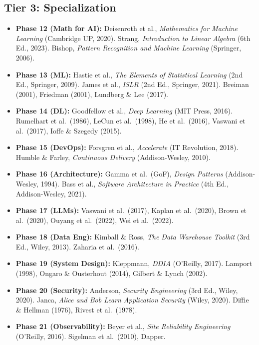 \documentclass[11pt, a4paper, oneside]{report}
\begin{document}
{{{{{{{{{{{{\subsection*{Tier 3: Specialization}
\begin{itemize}[leftmargin=*]
\item \textbf{Phase 12 (Math for AI):} Deisenroth et al., \emph{Mathematics for Machine Learning} (Cambridge UP, 2020). Strang, \emph{Introduction to Linear Algebra} (6th Ed., 2023). Bishop, \emph{Pattern Recognition and Machine Learning} (Springer, 2006).
\item \textbf{Phase 13 (ML):} Hastie et al., \emph{The Elements of Statistical Learning} (2nd Ed., Springer, 2009). James et al., \emph{ISLR} (2nd Ed., Springer, 2021). Breiman (2001), Friedman (2001), Lundberg \& Lee (2017).
\item \textbf{Phase 14 (DL):} Goodfellow et al., \emph{Deep Learning} (MIT Press, 2016). Rumelhart et al.\ (1986), LeCun et al.\ (1998), He et al.\ (2016), Vaswani et al.\ (2017), Ioffe \& Szegedy (2015).
\item \textbf{Phase 15 (DevOps):} Forsgren et al., \emph{Accelerate} (IT Revolution, 2018). Humble \& Farley, \emph{Continuous Delivery} (Addison-Wesley, 2010).
\item \textbf{Phase 16 (Architecture):} Gamma et al.\ (GoF), \emph{Design Patterns} (Addison-Wesley, 1994). Bass et al., \emph{Software Architecture in Practice} (4th Ed., Addison-Wesley, 2021).
\item \textbf{Phase 17 (LLMs):} Vaswani et al.\ (2017), Kaplan et al.\ (2020), Brown et al.\ (2020), Ouyang et al.\ (2022), Wei et al.\ (2022).
\item \textbf{Phase 18 (Data Eng):} Kimball \& Ross, \emph{The Data Warehouse Toolkit} (3rd Ed., Wiley, 2013). Zaharia et al.\ (2016).
\item \textbf{Phase 19 (System Design):} Kleppmann, \emph{DDIA} (O'Reilly, 2017). Lamport (1998), Ongaro \& Ousterhout (2014), Gilbert \& Lynch (2002).
\item \textbf{Phase 20 (Security):} Anderson, \emph{Security Engineering} (3rd Ed., Wiley, 2020). Janca, \emph{Alice and Bob Learn Application Security} (Wiley, 2020). Diffie \& Hellman (1976), Rivest et al.\ (1978).
\item \textbf{Phase 21 (Observability):} Beyer et al., \emph{Site Reliability Engineering} (O'Reilly, 2016). Sigelman et al.\ (2010), Dapper.
\end{itemize}

}}}}}}}}}}}}
\end{document}

